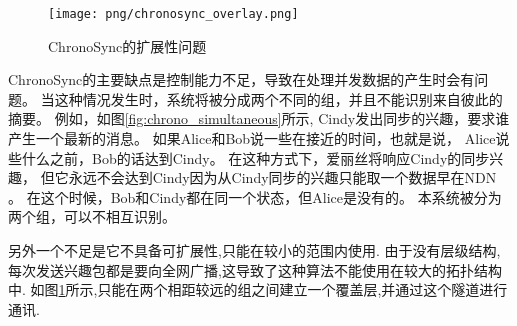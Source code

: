 \begin{figure}
\centering
\texttt{[image: png/chronosync\_overlay.png]}
\caption{ChronoSync的扩展性问题}
\label{fig:chrono_scalability}
\end{figure}


ChronoSync的主要缺点是控制能力不足，导致在处理并发数据的产生时会有问题。
当这种情况发生时，系统将被分成两个不同的组，并且不能识别来自彼此的摘要。
例如，如图\ref{fig:chrono_simultaneous}所示,
Cindy发出同步的兴趣，要求谁产生一个最新的消息。
如果Alice和Bob说一些在接近的时间，也就是说，
Alice说些什么之前，Bob的话达到Cindy。
在这种方式下，爱丽丝将响应Cindy的同步兴趣，
但它永远不会达到Cindy因为从Cindy同步的兴趣只能取一个数据早在NDN 。
在这个时候，Bob和Cindy都在同一个状态，但Alice是没有的。
本系统被分为两个组，可以不相互识别。

另外一个不足是它不具备可扩展性,只能在较小的范围内使用.
由于没有层级结构,每次发送兴趣包都是要向全网广播,这导致了这种算法不能使用在较大的拓扑结构中.
如图\ref{fig:chrono_scalability}所示,只能在两个相距较远的组之间建立一个覆盖层,并通过这个隧道进行通讯.
